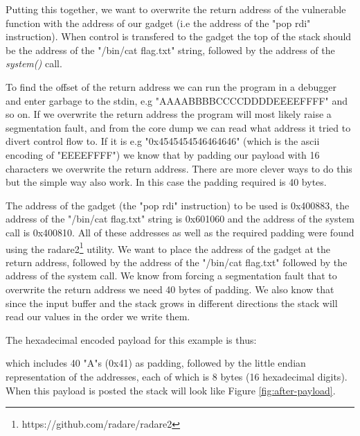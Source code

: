 Putting this together, we want to overwrite the return address of the vulnerable function
with the address of our gadget (i.e the address of the "pop rdi" instruction). When control
is transfered to the gadget the top of the stack should be the address of the "/bin/cat flag.txt"
string, followed by the address of the \textit{system()} call.

To find the offset of the return address we can run the program in a debugger and enter
garbage to the stdin, e.g "AAAABBBBCCCCDDDDEEEEFFFF" and so on. If we overwrite the return
address the program will most likely raise a segmentation fault, and from the core dump we
can read what address it tried to divert control flow to. If it is e.g "0x4545454546464646"
(which is the ascii encoding of "EEEEFFFF") we know that by padding our payload with 16
characters we overwrite the return address. There are more clever ways to do this but the
simple way also work. In this case the padding required is 40 bytes.

The address of the gadget (the "pop rdi" instruction) to be used is 0x400883, the address
of the "/bin/cat flag.txt" string is 0x601060 and the address of the system call is
0x400810. All of these addresses as well as the required padding were found using the
radare2\footnote{https://github.com/radare/radare2} utility. We want to place the address
of the gadget at the return address, followed by the address of the "/bin/cat flag.txt"
followed by the address of the system call. We know from forcing a segmentation fault that
to overwrite the return address we need 40 bytes of padding. We also know that since the
input buffer and the stack grows in different directions the stack will read our values in
the order we write them.

The hexadecimal encoded payload for this example is thus:


which includes 40 "A"s (0x41) as padding, followed by the little endian
representation of the addresses, each of which is 8 bytes (16 hexadecimal digits). When
this payload is posted the stack will look like Figure \ref{fig:after-payload}.


